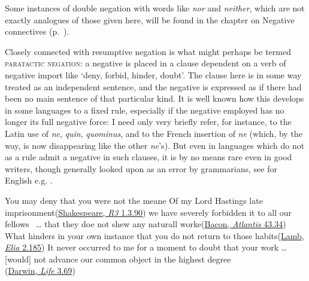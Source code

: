 Some instances of double negation with words like \textit{nor} and \textit{neither}, which are not exactly analogues of those given here, will be found in the chapter on Negative connectives (p.~\pageref{ch:10}).


\label{paratactic}Closely connected with resumptive negation is what might perhaps be termed \textsc{paratactic negation}: a negative is placed in a clause dependent on a verb of negative import like `deny, forbid, hinder, doubt'. The clause here is in some way treated as an independent sentence, and the negative is expressed as if there had been no main sentence of that particular kind. It is well known how this develops in some languages to a fixed rule, especially if the negative employed has no longer its full negative force: I need only very briefly refer, for instance, to the Latin use of \textit{ne}, \textit{quin}, \textit{quominus}, and to the French insertion of \textit{ne} (which, by the way, is now disappearing like the other \textit{ne}'s). But even in languages which do not as a rule admit a negative in such clauses, it is by no means rare even in good writers, though generally looked upon as an error by grammarians, see for English e.g. .

\ea \label{ex:07-67}
\ea You may deny that you were not the meane Of my Lord Hastings late imprisonment\hfill(\href{https://internetshakespeare.uvic.ca/doc/R3_F1/scene/1.3/index.html#tln-555}{Shakespeare, \textit{R3} 1.3.90})
\ex we have severely forbidden it to all our fellows \ {\dots} that they doe not shew any naturall worke\hfill(\href{https://archive.org/details/bim_early-english-books-1641-1700_new-atlantis_bacon-sir-francis_1658/page/32/mode/2up?q=%22forbidden+it%22&view=theater}{Bacon, \textit{Atlantis} 43.34}) %
\ex What hinders in your own instance that you do not return to those habits\hfill(\href{https://archive.org/details/essayseliacharle00lamb/page/296/mode/2up?q=%22what+hinders%22&view=theater}{Lamb, \textit{Elia} 2.185})
\ex It never occurred to me for a moment to doubt that your work {\dots} {[}would{]} not advance our common object in the highest degree\\\hfill(\href{https://www.darwinproject.ac.uk/letter/DCP-LETT-5544.xml}{Darwin, \textit{Life} 3.69}) %
\z
\z
 
